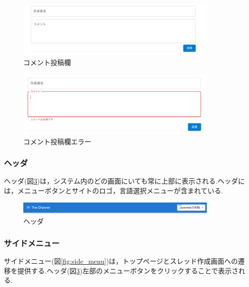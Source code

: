 \documentclass[b5paper,12pt,dvipdfmx]{jsreport}
\begin{document}
\begin{figure}[H]
	\centering
    \includegraphics[width=100mm,height=28.19mm]{./img/feature/comment_textfield.png}
	\caption{コメント投稿欄}
	\label{fig:comment_textfield}
\end{figure}

\begin{figure}[H]
	\centering
    \includegraphics[width=100mm,height=32.90mm]{./img/feature/comment_textfield_error.png}
	\caption{コメント投稿欄エラー}
	\label{fig:comment_textfield_error}
\end{figure}


\subsubsection{ヘッダ}
ヘッダ(図\ref{fig:header})は，システム内のどの画面にいても常に上部に表示される.ヘッダには，メニューボタンとサイトのロゴ，言語選択メニューが含まれている.

\begin{figure}[H]
	\centering
    \includegraphics[width=100mm,height=6.66mm]{./img/feature/header.png}
	\caption{ヘッダ}
	\label{fig:header}
\end{figure}

\newpage
\subsubsection{サイドメニュー}
サイドメニュー(図\ref{fig:side_menu})は，トップページとスレッド作成画面への遷移を提供する.ヘッダ(図\ref{fig:header})左部のメニューボタンをクリックすることで表示される.
\end{document}
